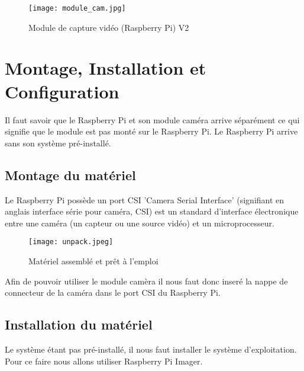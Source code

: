         \begin{figure}[ht]
            \centering        
            \texttt{[image: module\_cam.jpg]}
            \caption{Module de capture vidéo (Raspberry Pi) V2}
        \end{figure}
        
    \section{Montage, Installation et Configuration}
        Il faut savoir que le Raspberry Pi et son module caméra arrive séparément ce qui signifie que le module est pas monté sur le Raspberry Pi.
        Le Raspberry Pi arrive sans son système pré-installé.
            \subsection{Montage du matériel}
            Le Raspberry Pi possède un port CSI 'Camera Serial Interface' (signifiant en anglais interface série pour caméra, CSI) est un standard d'interface électronique entre une caméra (un capteur ou une source vidéo) et un microprocesseur.

            \begin{figure}[h]
                \centering
                \texttt{[image: unpack.jpeg]} 
                \caption{Matériel assemblé et prêt à l'emploi}
            \end{figure}

            \vspace{0.2cm}

            Afin de pouvoir utiliser le module camèra il nous faut donc inseré la nappe de connecteur de la caméra dans le port CSI du Raspberry Pi.
            \subsection{Installation du matériel}
            Le système étant pas pré-installé, il nous faut installer le système d'exploitation.
            Pour ce faire nous allons utiliser Raspberry Pi Imager.

            \vspace{0.2cm}

